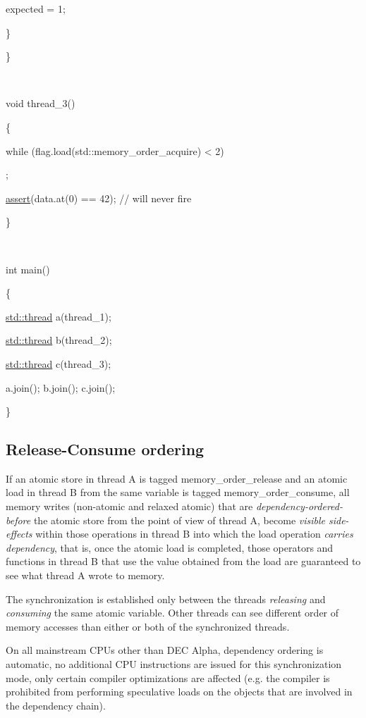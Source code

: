 \documentclass[
]{article}
\begin{document}
expected = 1;

\}

\}

~

void thread\_3()

\{

while (flag.load(std::memory\_order\_acquire) \textless{} 2)

;

\href{http://en.cppreference.com/w/cpp/error/assert}{assert}(data.at(0)
== 42); // will never fire

\}

~

int main()

\{

\href{http://en.cppreference.com/w/cpp/thread/thread}{std::thread}
a(thread\_1);

\href{http://en.cppreference.com/w/cpp/thread/thread}{std::thread}
b(thread\_2);

\href{http://en.cppreference.com/w/cpp/thread/thread}{std::thread}
c(thread\_3);

a.join(); b.join(); c.join();

\}

\hypertarget{release-consume-ordering}{%
\subsection{Release-Consume ordering}\label{release-consume-ordering}}

If an atomic store in thread A is tagged memory\_order\_release and an
atomic load in thread B from the same variable is tagged
memory\_order\_consume, all memory writes (non-atomic and relaxed
atomic) that are \emph{dependency-ordered-before} the atomic store from
the point of view of thread A, become \emph{visible side-effects} within
those operations in thread B into which the load operation \emph{carries
dependency}, that is, once the atomic load is completed, those operators
and functions in thread B that use the value obtained from the load are
guaranteed to see what thread A wrote to memory.

The synchronization is established only between the threads
\emph{releasing} and \emph{consuming} the same atomic variable. Other
threads can see different order of memory accesses than either or both
of the synchronized threads.

On all mainstream CPUs other than DEC Alpha, dependency ordering is
automatic, no additional CPU instructions are issued for this
synchronization mode, only certain compiler optimizations are affected
(e.g. the compiler is prohibited from performing speculative loads on
the objects that are involved in the dependency chain).
\end{document}
